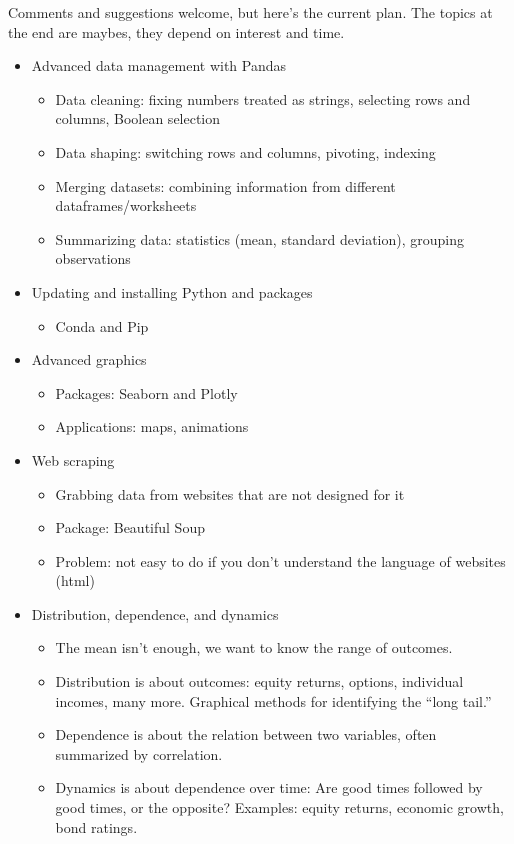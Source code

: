 \documentclass[11pt]{article}
\begin{document}
Comments and suggestions welcome, but here's the current plan.  
The topics at the end are maybes, they depend on interest and time.    
\begin{itemize}
\item Advanced data management with Pandas 
\begin{itemize}
\item Data cleaning:  fixing numbers treated as strings,
selecting rows and columns, Boolean selection 
\item Data shaping:  switching rows and columns, pivoting, indexing  
\item Merging datasets:  combining information from different dataframes/worksheets   
\item Summarizing data:  statistics (mean, standard deviation), grouping observations
\end{itemize}


\item Updating and installing Python and packages 
\begin{itemize}
\item Conda and Pip 
\end{itemize}


\item Advanced graphics 
\begin{itemize}
\item Packages:  Seaborn and Plotly 
\item Applications:  maps, animations 
\end{itemize}


\item Web scraping  
\begin{itemize}
\item Grabbing data from websites that are not designed for it  
\item Package:  Beautiful Soup 
\item Problem:  not easy to do if you don't understand the language of websites (html)  
\end{itemize}

\item Distribution, dependence, and dynamics 
\begin{itemize}
\item The mean isn't enough, we want to know the range of outcomes. 
\item Distribution is about outcomes:  equity returns, options, individual incomes, many more.  
Graphical methods for identifying the ``long tail.''
\item Dependence is about the relation between two variables, often summarized by correlation.    
\item Dynamics is about dependence over time:  Are good times followed by good times, or the opposite?
Examples:  equity returns, economic growth, bond ratings.  
\end{itemize} 

\end{itemize}
\end{document}
